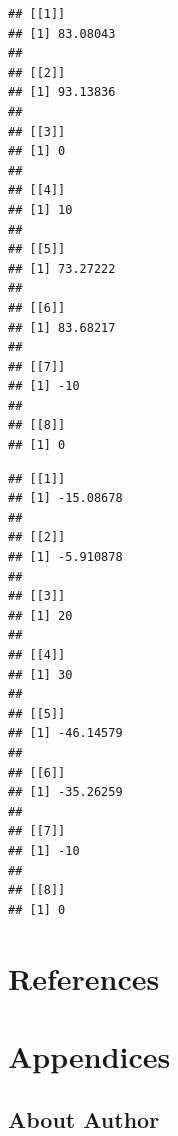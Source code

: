 \documentclass[
]{article}
\newenvironment{Shaded}{\begin{snugshade}}{\end{snugshade}}
\newcommand{\ControlFlowTok}[1]{\textcolor[rgb]{0.13,0.29,0.53}{\textbf{#1}}}
\newcommand{\FunctionTok}[1]{\textcolor[rgb]{0.00,0.00,0.00}{#1}}
\newcommand{\NormalTok}[1]{#1}
\newcommand{\SpecialCharTok}[1]{\textcolor[rgb]{0.00,0.00,0.00}{#1}}
\newcommand{\StringTok}[1]{\textcolor[rgb]{0.31,0.60,0.02}{#1}}
\begin{document}
\begin{verbatim}
## [[1]]
## [1] 83.08043
## 
## [[2]]
## [1] 93.13836
## 
## [[3]]
## [1] 0
## 
## [[4]]
## [1] 10
## 
## [[5]]
## [1] 73.27222
## 
## [[6]]
## [1] 83.68217
## 
## [[7]]
## [1] -10
## 
## [[8]]
## [1] 0
\end{verbatim}

\begin{Shaded}
\end{Shaded}

\begin{verbatim}
## [[1]]
## [1] -15.08678
## 
## [[2]]
## [1] -5.910878
## 
## [[3]]
## [1] 20
## 
## [[4]]
## [1] 30
## 
## [[5]]
## [1] -46.14579
## 
## [[6]]
## [1] -35.26259
## 
## [[7]]
## [1] -10
## 
## [[8]]
## [1] 0
\end{verbatim}

\hypertarget{references}{%
\section*{References}\label{references}}

\hypertarget{appendices}{%
\section*{Appendices}\label{appendices}}

\hypertarget{about-author}{%
\subsection*{About Author}\label{about-author}}
\end{document}
